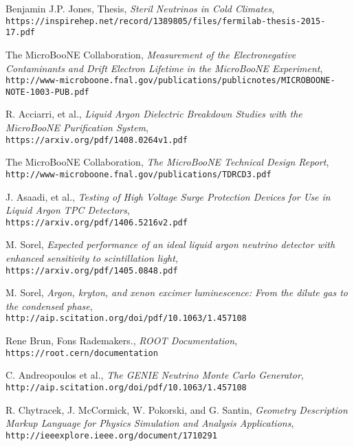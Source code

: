 \documentclass[12pt]{article}
\begin{document}
\begin{thebibliography}{20}
  Benjamin J.P. Jones, Thesis, \emph{Steril Neutrinos in Cold Climates},\\
  \texttt{https://inspirehep.net/record/1389805/files/fermilab-thesis-2015-17.pdf}

  The MicroBooNE Collaboration, \emph{Measurement of the Electronegative Contaminants and Drift Electron Lifetime in the MicroBooNE Experiment},\\
  \texttt{http://www-microboone.fnal.gov/publications/publicnotes/MICROBOONE-NOTE-1003-PUB.pdf}

  R. Acciarri, et al., \emph{Liquid Argon Dielectric Breakdown Studies with the MicroBooNE Purification System}, \\
  \texttt{https://arxiv.org/pdf/1408.0264v1.pdf}

  The MicroBooNE Collaboration, \emph{The MicroBooNE Technical Design Report}, \\
  \texttt{http://www-microboone.fnal.gov/publications/TDRCD3.pdf}

  J. Asaadi, et al., \emph{Testing of High Voltage Surge Protection Devices for Use in Liquid Argon TPC Detectors}, \\
  \texttt{https://arxiv.org/pdf/1406.5216v2.pdf}

  M. Sorel, \emph{Expected performance of an ideal liquid argon neutrino detector with enhanced sensitivity to scintillation light}, \\
  \texttt{https://arxiv.org/pdf/1405.0848.pdf}

  M. Sorel, \emph{Argon, kryton, and xenon excimer luminescence: From the dilute gas to the condensed phase}, \\
  \texttt{http://aip.scitation.org/doi/pdf/10.1063/1.457108}

  Rene Brun, Fons Rademakers., \emph{ROOT Documentation}, \\
  \texttt{https://root.cern/documentation}

  C. Andreopoulos et al., \emph{The GENIE Neutrino Monte Carlo Generator}, \\
  \texttt{http://aip.scitation.org/doi/pdf/10.1063/1.457108}

  R. Chytracek, J. McCormick, W. Pokorski, and G. Santin, \emph{Geometry Description Markup Language for Physics Simulation and Analysis Applications}, \\
  \texttt{http://ieeexplore.ieee.org/document/1710291}


\end{thebibliography}
\end{document}
